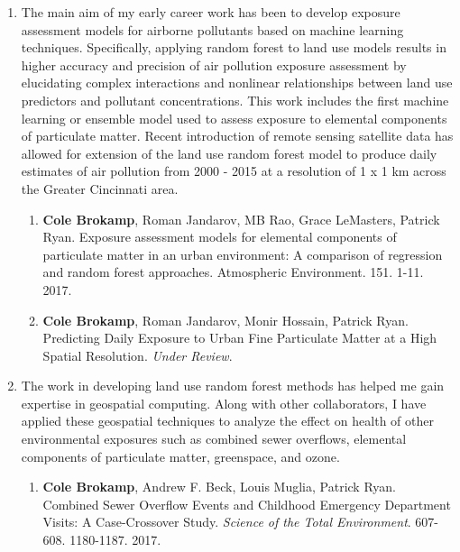 \documentclass{nihbiosketch}
\begin{document}
\begin{enumerate}


\item The main aim of my early career work has been to develop exposure assessment models for airborne pollutants based on machine learning techniques.  Specifically, applying random forest to land use models results in higher accuracy and precision of air pollution exposure assessment by elucidating complex interactions and nonlinear relationships between land use predictors and pollutant concentrations. This work includes the first machine learning or ensemble model used to assess exposure to elemental components of particulate matter. Recent introduction of remote sensing satellite data has allowed for extension of the land use random forest model to produce daily estimates of air pollution from 2000 - 2015 at a resolution of 1 x 1 km across the Greater Cincinnati area.

\begin{enumerate}
	
	\item \textbf{Cole Brokamp}, Roman Jandarov, MB Rao, Grace LeMasters, Patrick Ryan. Exposure assessment models for elemental components of particulate matter in an urban environment: A comparison of regression and random forest approaches. Atmospheric Environment. 151. 1-11. 2017.

	\item \textbf{Cole Brokamp}, Roman Jandarov, Monir Hossain, Patrick Ryan. Predicting Daily Exposure to Urban Fine Particulate Matter at a High Spatial Resolution. \emph{Under Review}.

\end{enumerate}

\item The work in developing land use random forest methods has helped me gain expertise in geospatial computing.  Along with other collaborators, I have applied these geospatial techniques to analyze the effect on health of other environmental exposures such as combined sewer overflows, elemental components of particulate matter, greenspace, and ozone.

\begin{enumerate}
	
	\item \textbf{Cole Brokamp}, Andrew F. Beck, Louis Muglia, Patrick Ryan. Combined Sewer Overflow Events and Childhood Emergency Department Visits: A Case-Crossover Study. \emph{Science of the Total Environment}. 607-608. 1180-1187. 2017.
	

\end{enumerate}
\end{enumerate}
\end{document}
